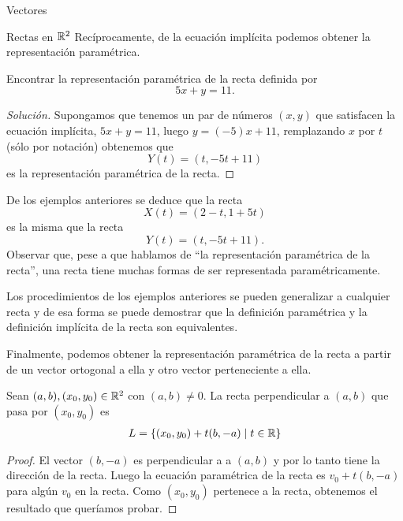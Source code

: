 \begin{chapter}{Vectores}
\begin{section}{Rectas en $\mathbb R^2$}
            Recíprocamente, de la ecuación implícita podemos obtener la representación paramétrica. 
            
            \begin{ejemplo*} Encontrar la representación paramétrica de la recta definida por 
                \begin{equation*}
                5x + y = 11. 
                \end{equation*}
            \end{ejemplo*}
            \begin{proof}[Solución]
                 Supongamos que tenemos un par de números $(x, y)$ que satisfacen la ecuación  implícita, $5x + y = 11$, luego $y = (-5)x + 11$, remplazando $x$ por $t$ (sólo por notación) obtenemos que 
                 \begin{equation*}
                     Y(t) = (t, -5t+11)
                 \end{equation*}
                es la representación paramétrica de la recta.
        \end{proof}	 
    

     
     De los ejemplos anteriores se deduce que la recta 
     \begin{equation*}
         X(t)=  (2-t,1+5t)
     \end{equation*}
     es la misma que la recta 
     \begin{equation*}
         Y(t) = (t, -5t+11).
     \end{equation*}     
     Observar que, pese a que hablamos de ``la representación paramétrica de la recta'', una recta tiene muchas formas de ser representada paramétricamente. 
    
        Los procedimientos  de los ejemplos anteriores se pueden generalizar a cualquier recta y de esa forma se puede demostrar que la definición paramétrica y la definición implícita de la recta son equivalentes. 
        
        Finalmente, podemos obtener la representación paramétrica de la recta a partir de un vector ortogonal a ella y otro vector perteneciente a ella. 
                
        \begin{proposicion}
            Sean $(a,b),(x_0,y_0)\in\mathbb R^2$ con $(a,b)\neq0$.  La recta perpendicular a $(a,b)$ que pasa por $(x_0,y_0)$ es
            \begin{align*}
            L=\left\{(x_0,y_0)+t(b,-a)\mid t\in\mathbb R\right\} 
            \end{align*}
        \end{proposicion}
    \begin{proof}
    El vector $(b,-a)$  es perpendicular a a $(a,b)$  y por lo tanto tiene la dirección de la recta. Luego  la ecuación paramétrica de la recta es $v_0+t(b,-a)$ para algún $v_0$  en la recta. Como $(x_0,y_0)$ pertenece a la recta, obtenemos el resultado que queríamos probar.
    \end{proof}
        


\end{section}
\end{chapter}
